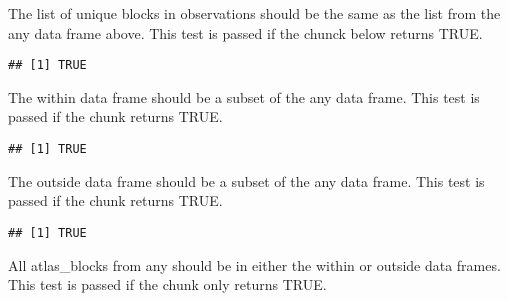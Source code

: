\documentclass[
]{article}
\newenvironment{Shaded}{\begin{snugshade}}{\end{snugshade}}
\newcommand{\CommentTok}[1]{\textcolor[rgb]{0.56,0.35,0.01}{\textit{#1}}}
\newcommand{\DecValTok}[1]{\textcolor[rgb]{0.00,0.00,0.81}{#1}}
\newcommand{\FunctionTok}[1]{\textcolor[rgb]{0.13,0.29,0.53}{\textbf{#1}}}
\newcommand{\NormalTok}[1]{#1}
\newcommand{\SpecialCharTok}[1]{\textcolor[rgb]{0.81,0.36,0.00}{\textbf{#1}}}
\begin{document}
The list of unique blocks in observations should be the same as the list
from the any data frame above. This test is passed if the chunck below
returns TRUE.

\begin{Shaded}
\end{Shaded}

\begin{verbatim}
## [1] TRUE
\end{verbatim}

The within data frame should be a subset of the any data frame. This
test is passed if the chunk returns TRUE.

\begin{Shaded}
\end{Shaded}

\begin{verbatim}
## [1] TRUE
\end{verbatim}

The outside data frame should be a subset of the any data frame. This
test is passed if the chunk returns TRUE.

\begin{Shaded}
\end{Shaded}

\begin{verbatim}
## [1] TRUE
\end{verbatim}

All atlas\_blocks from any should be in either the within or outside
data frames. This test is passed if the chunk only returns TRUE.
\end{document}
